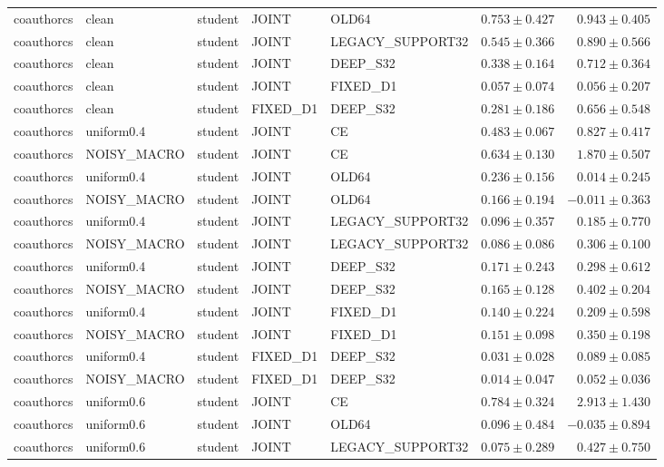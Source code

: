 \begin{longtable}{lllllrr}
coauthorcs & clean & student & JOINT & OLD64 & $0.753 \pm 0.427$ & $0.943 \pm 0.405$ \\
coauthorcs & clean & student & JOINT & LEGACY\_SUPPORT32 & $0.545 \pm 0.366$ & $0.890 \pm 0.566$ \\
coauthorcs & clean & student & JOINT & DEEP\_S32 & $0.338 \pm 0.164$ & $0.712 \pm 0.364$ \\
coauthorcs & clean & student & JOINT & FIXED\_D1 & $0.057 \pm 0.074$ & $0.056 \pm 0.207$ \\
coauthorcs & clean & student & FIXED\_D1 & DEEP\_S32 & $0.281 \pm 0.186$ & $0.656 \pm 0.548$ \\
coauthorcs & uniform0.4 & student & JOINT & CE & $0.483 \pm 0.067$ & $0.827 \pm 0.417$ \\
coauthorcs & NOISY\_MACRO & student & JOINT & CE & $0.634 \pm 0.130$ & $1.870 \pm 0.507$ \\
coauthorcs & uniform0.4 & student & JOINT & OLD64 & $0.236 \pm 0.156$ & $0.014 \pm 0.245$ \\
coauthorcs & NOISY\_MACRO & student & JOINT & OLD64 & $0.166 \pm 0.194$ & $-0.011 \pm 0.363$ \\
coauthorcs & uniform0.4 & student & JOINT & LEGACY\_SUPPORT32 & $0.096 \pm 0.357$ & $0.185 \pm 0.770$ \\
coauthorcs & NOISY\_MACRO & student & JOINT & LEGACY\_SUPPORT32 & $0.086 \pm 0.086$ & $0.306 \pm 0.100$ \\
coauthorcs & uniform0.4 & student & JOINT & DEEP\_S32 & $0.171 \pm 0.243$ & $0.298 \pm 0.612$ \\
coauthorcs & NOISY\_MACRO & student & JOINT & DEEP\_S32 & $0.165 \pm 0.128$ & $0.402 \pm 0.204$ \\
coauthorcs & uniform0.4 & student & JOINT & FIXED\_D1 & $0.140 \pm 0.224$ & $0.209 \pm 0.598$ \\
coauthorcs & NOISY\_MACRO & student & JOINT & FIXED\_D1 & $0.151 \pm 0.098$ & $0.350 \pm 0.198$ \\
coauthorcs & uniform0.4 & student & FIXED\_D1 & DEEP\_S32 & $0.031 \pm 0.028$ & $0.089 \pm 0.085$ \\
coauthorcs & NOISY\_MACRO & student & FIXED\_D1 & DEEP\_S32 & $0.014 \pm 0.047$ & $0.052 \pm 0.036$ \\
coauthorcs & uniform0.6 & student & JOINT & CE & $0.784 \pm 0.324$ & $2.913 \pm 1.430$ \\
coauthorcs & uniform0.6 & student & JOINT & OLD64 & $0.096 \pm 0.484$ & $-0.035 \pm 0.894$ \\
coauthorcs & uniform0.6 & student & JOINT & LEGACY\_SUPPORT32 & $0.075 \pm 0.289$ & $0.427 \pm 0.750$ \\

\end{longtable}
